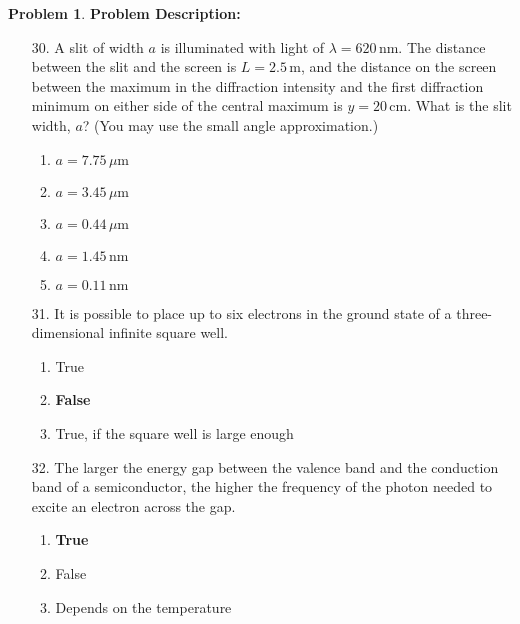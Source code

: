 \documentclass[12pt]{article}
\theoremstyle{definition} %
\newtheorem{problem}{Problem}
\theoremstyle{plain} %
\begin{document}
\begin{problem}
    \textbf{Problem Description:}

    \begin{enumerate}
        \item[30.] A slit of width \(a\) is illuminated with light of \(\lambda = 620 \, \text{nm}\). The distance between the slit and the screen is \(L = 2.5 \, \text{m}\), and the distance on the screen between the maximum in the diffraction intensity and the first diffraction minimum on either side of the central maximum is \(y = 20 \, \text{cm}\). What is the slit width, \(a\)? (You may use the small angle approximation.)
        \begin{enumerate}
            \item \textbf{\(a = 7.75 \, \mu\text{m}\)}
            \item \(a = 3.45 \, \mu\text{m}\)
            \item \(a = 0.44 \, \mu\text{m}\)
            \item \(a = 1.45 \, \text{nm}\)
            \item \(a = 0.11 \, \text{nm}\)
        \end{enumerate}
    
        \item[31.] It is possible to place up to six electrons in the ground state of a three-dimensional infinite square well.
        \begin{enumerate}
            \item True
            \item \textbf{False}
            \item True, if the square well is large enough
        \end{enumerate}
    
        \item[32.] The larger the energy gap between the valence band and the conduction band of a semiconductor, the higher the frequency of the photon needed to excite an electron across the gap.
        \begin{enumerate}
            \item \textbf{True}
            \item False
            \item Depends on the temperature
        \end{enumerate}
    \end{enumerate}
    

\end{problem}
\end{document}
